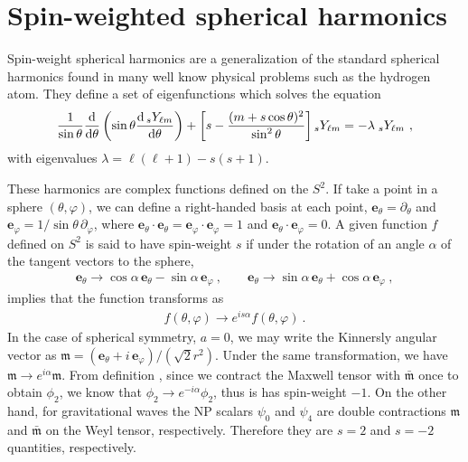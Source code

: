 
\chapter{Spin-weighted spherical harmonics}
\label{AppendixSWHs}

Spin-weight spherical harmonics \cite{Goldberg1967,Scanio1977,TorresdelCastillo2003} are a generalization of the standard spherical harmonics
found in many well know physical problems such as the hydrogen atom.
They define a set of eigenfunctions which solves the equation
\begin{equation}
	\label{eqA:diffSWSH}
	\frac{1}{\sin\theta} \frac{\dd}{\dd\theta} \left( \sin\theta 
	\frac{\dd \,\uu[s]{Y}{\ell m}}{\dd \theta} \right)
    + \left[ s - \frac{(m + s \cos\theta)^2}{\sin^2\theta} \right] \uu[s]{Y}{\ell m} = - \lambda \;\uu[s]{Y}{\ell m}~,
\end{equation}
with eigenvalues $\lambda= \ell(\ell +1) - s(s+1)$.

These harmonics are complex functions defined on the $S^2$. If take a point in a sphere $(\theta,\varphi)$, we can define a right-handed basis at each point, $\bm{e}_\theta = \partial_\theta$ and $\bm{e}_\varphi = 1/\sin\theta \,\partial_\varphi$, where $\bm{e}_\theta \cdot \bm{e}_\theta = \bm{e}_\varphi \cdot \bm{e}_\varphi = 1$ and $\bm{e}_\theta \cdot \bm{e}_\varphi = 0$.
A given function $f$ defined on $S^2$ is said to have spin-weight $s$ if under the rotation of an angle $\alpha$ of the tangent vectors to the sphere,
\begin{align}
	\label{eqC:spinTransformation}
	\bm{e}_\theta \to \cos\alpha \,\bm{e}_\theta - \sin\alpha \,\bm{e}_\varphi ~, \qquad \bm{e}_\theta \to \sin\alpha \,\bm{e}_\theta + \cos\alpha \,\bm{e}_\varphi ~,
\end{align}
implies that the function transforms as
\begin{align}
	f(\theta, \varphi) \to e^{i s \alpha} f(\theta, \varphi) ~.
\end{align}
In the case of spherical symmetry, $a=0$, we may write the Kinnersly angular vector as $\bm{\mathfrak{m}} = (\bm{e}_\theta + i \,\bm{e}_\varphi)/(\sqrt{2} r^2)$. Under the same transformation, we have $\bm{\mathfrak{m}}\to e^{i\alpha} \bm{\mathfrak{m}}$. From definition , since we contract the Maxwell tensor with $\bm{\bar{\mathfrak{m}}}$ once to obtain $\phi_2$, we know that $\phi_2 \to e^{-i \alpha} \phi_2$, thus is has spin-weight $-1$. On the other hand, for gravitational waves the NP scalars $\psi_0$ and $\psi_4$ are double contractions $\bm{\mathfrak{m}}$ and $\bm{\bar{\mathfrak{m}}}$ on the Weyl tensor, respectively. Therefore they are $s=2$ and $s=-2$ quantities, respectively.

